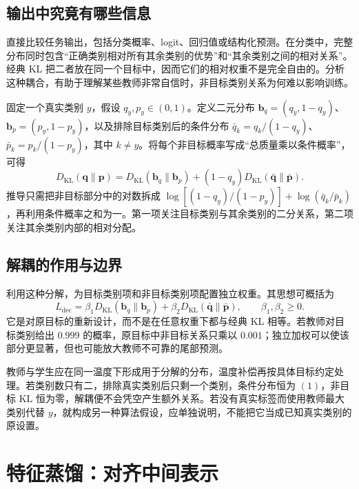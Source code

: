 \documentclass[UTF8,12pt,a4paper,fontset=fandol]{ctexart}
\begin{document}
\subsection{输出中究竟有哪些信息}
直接比较任务输出，包括分类概率、logit、回归值或结构化预测。在分类中，完整分布同时包含“正确类别相对所有其余类别的优势”和“其余类别之间的相对关系”。经典 KL 把二者放在同一个目标中，因而它们的相对权重不是完全自由的。分析这种耦合，有助于理解某些教师非常自信时，非目标类别关系为何难以影响训练。

固定一个真实类别 $y$，假设 $q_y,p_y\in(0,1)$。定义二元分布 $\mathbf b_q=(q_y,1-q_y)$、$\mathbf b_p=(p_y,1-p_y)$，以及排除目标类别后的条件分布 $\bar q_k=q_k/(1-q_y)$、$\bar p_k=p_k/(1-p_y)$，其中 $k\ne y$。将每个非目标概率写成“总质量乘以条件概率”，可得
\begin{equation}
 D_{\mathrm{KL}}(\mathbf q\|\mathbf p)
 =D_{\mathrm{KL}}(\mathbf b_q\|\mathbf b_p)
 +(1-q_y)D_{\mathrm{KL}}(\bar{\mathbf q}\|\bar{\mathbf p}).
 \label{eq:kd-decomposition}
\end{equation}
推导只需把非目标部分中的对数拆成 $\log[(1-q_y)/(1-p_y)]+\log(\bar q_k/\bar p_k)$，再利用条件概率之和为一。第一项关注目标类别与其余类别的二分关系，第二项关注其余类别内部的相对分配。

\subsection{解耦的作用与边界}
利用这种分解，为目标类别项和非目标类别项配置独立权重\cite{zhao2022}。其思想可概括为
\[
 L_{\mathrm{dec}}=\beta_1D_{\mathrm{KL}}(\mathbf b_q\|\mathbf b_p)
 +\beta_2D_{\mathrm{KL}}(\bar{\mathbf q}\|\bar{\mathbf p}),\qquad \beta_1,\beta_2\geq0.
\]
它是对原目标的重新设计，而不是在任意权重下都与经典 KL 相等。若教师对目标类别给出 $0.999$ 的概率，原目标中非目标关系只乘以 $0.001$；独立加权可以使该部分更显著，但也可能放大教师不可靠的尾部预测。

教师与学生应在同一温度下形成用于分解的分布，温度补偿再按具体目标约定处理。若类别数只有二，排除真实类别后只剩一个类别，条件分布恒为 $(1)$，非目标 KL 恒为零，解耦便不会凭空产生额外关系。若没有真实标签而使用教师最大类别代替 $y$，就构成另一种算法假设，应单独说明，不能把它当成已知真实类别的原设置。

\section{特征蒸馏：对齐中间表示}
\label{sec:kd-feature}
\end{document}
